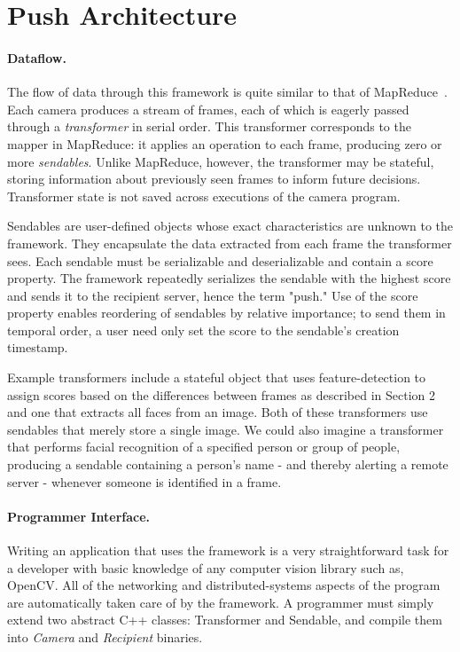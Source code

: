 \section{Push Architecture}

\paragraph{Dataflow.}

The flow of data through this framework is quite similar to that of MapReduce~\cite{mapreduce}.
Each camera produces a stream of frames, each of which is eagerly passed
through a \emph{transformer} in serial order.  This transformer corresponds to
the mapper in MapReduce: it applies an operation to each frame, producing
zero or more \emph{sendables}.  Unlike MapReduce, however, the transformer may be
stateful, storing information about previously seen frames to inform future decisions.
Transformer state is not saved across executions of the camera program.

Sendables are user-defined objects whose exact
characteristics are unknown to the framework.  They encapsulate the data extracted
from each frame the transformer sees.  Each sendable
must be serializable and deserializable and contain a score property.  The
framework repeatedly serializes the sendable with the highest score and sends
it to the recipient server, hence the term "push."  Use of the score property enables reordering of sendables
by relative importance; to send them in temporal order, a user need only set the
score to the sendable's creation timestamp.

Example transformers include a stateful object that uses feature-detection to assign scores
based on the differences between frames as described in Section 2 and
one that extracts all faces from an image.  Both of these transformers use sendables
that merely store a single image.  We could also imagine a transformer that performs facial recognition
of a specified person or group of people, producing a sendable containing a person's name -
and thereby alerting a remote server - whenever someone is identified in a frame.

\paragraph{Programmer Interface.}

Writing an application that uses the framework is a very straightforward
task for a developer with basic knowledge of any computer vision library such as, OpenCV.  All of the
networking and distributed-systems aspects of the program are automatically
taken care of by the framework.  A programmer must simply extend two
abstract C++ classes: Transformer and Sendable, and compile them into
\emph{Camera} and \emph{Recipient} binaries.

